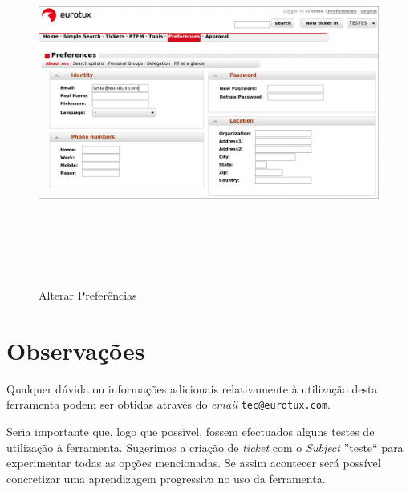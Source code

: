 \begin{figure}[H]
\begin{center}
\includegraphics[width=16cm,height=12cm]{include/img/rt5}
\end{center}
\caption{Alterar Preferências}
\label{fig:boot}
\end{figure}


\section{Observações}
Qualquer dúvida ou informações adicionais relativamente à utilização desta ferramenta podem ser obtidas através do \emph{email} \texttt{tec@eurotux.com}.

Seria importante que, logo que possível, fossem efectuados alguns testes de utilização à ferramenta. Sugerimos a criação de \emph{ticket} com o \emph{Subject} ''teste`` para experimentar todas as opções mencionadas. Se assim acontecer será possível concretizar uma aprendizagem progressiva no uso da ferramenta.
